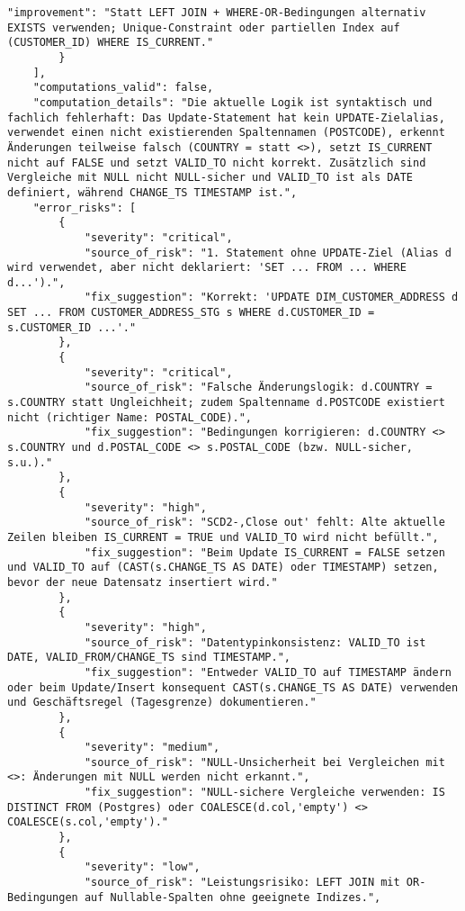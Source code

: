 \begin{lstlisting}[caption={Ausgabe: GPT-5 Anwendungsfall 9 Hauptdurchlauf},label={gpt_case9_prompt1}]
            "improvement": "Statt LEFT JOIN + WHERE-OR-Bedingungen alternativ EXISTS verwenden; Unique-Constraint oder partiellen Index auf (CUSTOMER_ID) WHERE IS_CURRENT."
        }
    ],
    "computations_valid": false,
    "computation_details": "Die aktuelle Logik ist syntaktisch und fachlich fehlerhaft: Das Update-Statement hat kein UPDATE-Zielalias, verwendet einen nicht existierenden Spaltennamen (POSTCODE), erkennt Änderungen teilweise falsch (COUNTRY = statt <>), setzt IS_CURRENT nicht auf FALSE und setzt VALID_TO nicht korrekt. Zusätzlich sind Vergleiche mit NULL nicht NULL-sicher und VALID_TO ist als DATE definiert, während CHANGE_TS TIMESTAMP ist.",
    "error_risks": [
        {
            "severity": "critical",
            "source_of_risk": "1. Statement ohne UPDATE-Ziel (Alias d wird verwendet, aber nicht deklariert: 'SET ... FROM ... WHERE d...').",
            "fix_suggestion": "Korrekt: 'UPDATE DIM_CUSTOMER_ADDRESS d SET ... FROM CUSTOMER_ADDRESS_STG s WHERE d.CUSTOMER_ID = s.CUSTOMER_ID ...'."
        },
        {
            "severity": "critical",
            "source_of_risk": "Falsche Änderungslogik: d.COUNTRY = s.COUNTRY statt Ungleichheit; zudem Spaltenname d.POSTCODE existiert nicht (richtiger Name: POSTAL_CODE).",
            "fix_suggestion": "Bedingungen korrigieren: d.COUNTRY <> s.COUNTRY und d.POSTAL_CODE <> s.POSTAL_CODE (bzw. NULL-sicher, s.u.)."
        },
        {
            "severity": "high",
            "source_of_risk": "SCD2-,Close out' fehlt: Alte aktuelle Zeilen bleiben IS_CURRENT = TRUE und VALID_TO wird nicht befüllt.",
            "fix_suggestion": "Beim Update IS_CURRENT = FALSE setzen und VALID_TO auf (CAST(s.CHANGE_TS AS DATE) oder TIMESTAMP) setzen, bevor der neue Datensatz insertiert wird."
        },
        {
            "severity": "high",
            "source_of_risk": "Datentypinkonsistenz: VALID_TO ist DATE, VALID_FROM/CHANGE_TS sind TIMESTAMP.",
            "fix_suggestion": "Entweder VALID_TO auf TIMESTAMP ändern oder beim Update/Insert konsequent CAST(s.CHANGE_TS AS DATE) verwenden und Geschäftsregel (Tagesgrenze) dokumentieren."
        },
        {
            "severity": "medium",
            "source_of_risk": "NULL-Unsicherheit bei Vergleichen mit <>: Änderungen mit NULL werden nicht erkannt.",
            "fix_suggestion": "NULL-sichere Vergleiche verwenden: IS DISTINCT FROM (Postgres) oder COALESCE(d.col,'empty') <> COALESCE(s.col,'empty')."
        },
        {
            "severity": "low",
            "source_of_risk": "Leistungsrisiko: LEFT JOIN mit OR-Bedingungen auf Nullable-Spalten ohne geeignete Indizes.",

\end{lstlisting}
